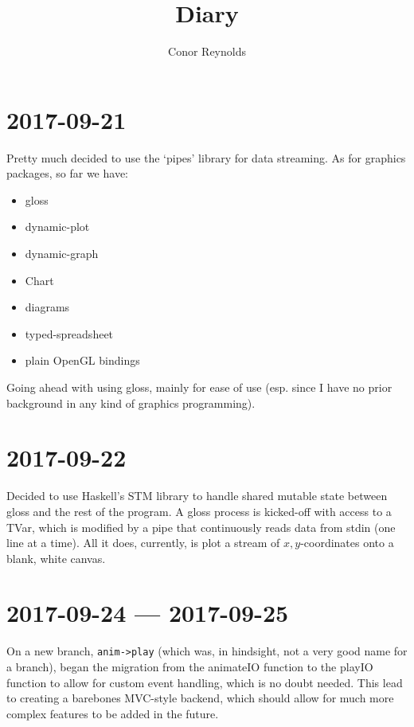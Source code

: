 \documentclass[a5paper,11pt]{article}
\title{Diary}
\author{Conor Reynolds}
\date{}
\begin{document}
	\maketitle
	
	\section*{2017-09-21}
	
	Pretty much decided to use the `pipes' library for data streaming. As for graphics packages, so far we have:
	
	\begin{itemize}
		\item gloss
		\item dynamic-plot
		\item dynamic-graph
		\item Chart
		\item diagrams
		\item typed-spreadsheet
		\item plain OpenGL bindings
	\end{itemize}
	
	Going ahead with using gloss, mainly for ease of use (esp. since I have no prior background in any kind of graphics programming).
	
	\section*{2017-09-22}
	
	Decided to use Haskell's STM library to handle shared mutable state between gloss and the rest of the program. A gloss process is kicked-off with access to a TVar, which is modified by a pipe that continuously reads data from stdin (one line at a time). All it does, currently, is plot a stream of $ x,y $-coordinates onto a blank, white canvas.
	
	\section*{2017-09-24 --- 2017-09-25}
	
	On a new branch, \verb|anim->play| (which was, in hindsight, not a very good name for a branch), began the migration from the animateIO function to the playIO function to allow for custom event handling, which is no doubt needed. This lead to creating a barebones MVC-style backend, which should allow for much more complex features to be added in the future.
	
\end{document}
